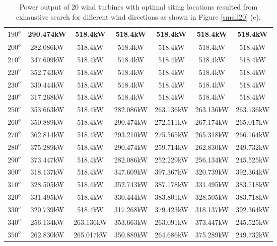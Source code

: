 \begin{table}[H]
\begin{tabular}{|c|c|c|c|c|c|c|}
		$190^o$	& 290.474kW	& 518.4kW	& 518.4kW	& 518.4kW	& 518.4kW	& 518.4kW	\\ \hline
		$200^o$	& 282.086kW	& 518.4kW	& 518.4kW	& 518.4kW	& 518.4kW	& 518.4kW	\\ \hline
		$210^o$	& 347.609kW	& 518.4kW	& 518.4kW	& 518.4kW	& 518.4kW	& 518.4kW	\\ \hline
		$220^o$	& 352.743kW	& 518.4kW	& 518.4kW	& 518.4kW	& 518.4kW	& 518.4kW	\\ \hline
		$230^o$	& 330.444kW	& 518.4kW	& 518.4kW	& 518.4kW	& 518.4kW	& 518.4kW	\\ \hline
		$240^o$	& 317.268kW	& 518.4kW	& 518.4kW	& 518.4kW	& 518.4kW	& 518.4kW	\\ \hline
		$250^o$	& 353.663kW	& 518.4kW	& 282.086kW	& 263.136kW	& 263.136kW	& 263.136kW	\\ \hline
		$260^o$	& 350.889kW	& 518.4kW	& 290.474kW	& 272.511kW	& 267.174kW	& 265.017kW	\\ \hline
		$270^o$	& 362.814kW	& 518.4kW	& 293.210kW	& 275.565kW	& 265.318kW	& 266.164kW	\\ \hline
		$280^o$	& 375.289kW	& 518.4kW	& 290.474kW	& 259.714kW	& 262.830kW	& 249.732kW	\\ \hline
		$290^o$	& 373.447kW	& 518.4kW	& 282.086kW	& 252.229kW	& 256.134kW	& 245.525kW	\\ \hline
		$300^o$	& 318.137kW	& 518.4kW	& 347.609kW	& 397.367kW	& 320.739kW	& 392.364kW	\\ \hline
		$310^o$	& 328.505kW	& 518.4kW	& 352.743kW	& 387.178kW	& 331.495kW	& 383.718kW	\\ \hline
		$320^o$	& 331.495kW	& 518.4kW	& 330.444kW	& 383.801kW	& 328.505kW	& 383.718kW	\\ \hline
		$330^o$	& 320.739kW	& 518.4kW	& 317.268kW	& 379.423kW	& 318.137kW	& 392.364kW	\\ \hline
		$340^o$	& 256.134kW	& 263.136kW	& 353.663kW	& 263.091kW	& 373.447kW	& 245.525kW	\\ \hline
		$350^o$	& 262.830kW	& 265.017kW	& 350.889kW	& 264.686kW	& 375.289kW	& 249.732kW	\\ \hline
        	\end{tabular}
        	\caption{Power output of 20 wind turbines with optimal siting locations resulted from exhaustive search for different wind directions as shown in Figure \ref{small20} (c).}
        	\label{table20c}
        \end{table}
        \doublespacing
        
